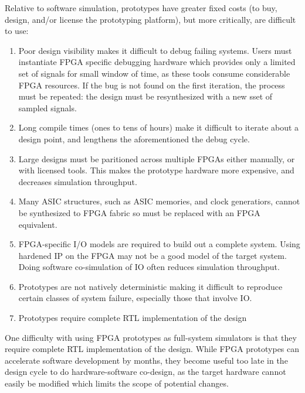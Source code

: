 Relative to software simulation, prototypes have greater fixed costs (to buy, design, and/or license the 
prototyping platform), but more critically, are difficult to use:
\begin{enumerate}
    \item Poor design visibility makes it difficult to debug failing systems. Users must instantiate
        FPGA specific debugging hardware which provides only a limited set of
        signals for small window of time, as these tools consume considerable
        FPGA resources.  If the bug is not found on the first iteration, the
        process must be repeated: the design must be resynthesized with a new
        sset of sampled signals.

    \item Long compile times (ones to tens of hours) make it difficult to
        iterate about a design point, and lengthens the aforementioned the debug cycle.

    \item Large designs must be paritioned across multiple FPGAs either
        manually, or with licensed tools. This makes the prototype hardware
        more expensive, and decreases simulation throughput.

    \item Many ASIC structures, such as ASIC memories, and clock generatiors,
        cannot be synthesized to FPGA fabric so must be replaced with an FPGA
        equivalent.

    \item FPGA-specific I/O models are required to build out a complete system. Using hardened
        IP on the FPGA may not be a good model of the target system. Doing software co-simulation of IO
        often reduces simulation throughput.

    \item Prototypes are not natively deterministic making it difficult to
        reproduce certain classes of system failure, especially those that
        involve IO.

    \item Prototypes require complete RTL implementation of the design
\end{enumerate}


One difficulty with using FPGA prototypes as full-system simulators is that they require complete
RTL implementation of the design. While
FPGA prototypes can accelerate software development by months, they become
useful too late in the design cycle to do hardware-software co-design, as the
target hardware cannot easily be modified which limits the scope of potential
changes.


